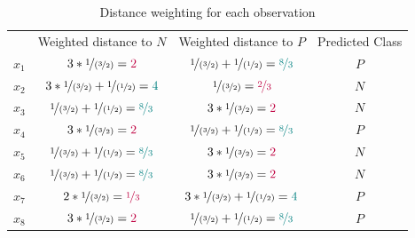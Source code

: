 \documentclass[12pt]{article}
\begin{document}
\begin{enumerate}[leftmargin=\labelsep]
\begin{table}[h]
  \centering
  \renewcommand{\arraystretch}{1.35} %
  \begin{tabular}{c|c|c|c}
        & Weighted distance to $N$                                & Weighted distance to $P$                                & Predicted Class \\
  $x_1$ & $3 * \nicefrac{1}{(\nicefrac{3}{2})} = \textcolor{purple}{2}$                           & $ \nicefrac{1}{(\nicefrac{3}{2})} + \nicefrac{1}{(\nicefrac{1}{2})} = \textcolor{teal}{\nicefrac{8}{3}}$    &  $P$               \\
  $x_2$ & $3 * \nicefrac{1}{(\nicefrac{3}{2})} + \nicefrac{1}{(\nicefrac{1}{2})} = \textcolor{teal}{4}$ & $ \nicefrac{1}{(\nicefrac{3}{2})} = \textcolor{purple}{\nicefrac{2}{3}}$                              &  $N$               \\
  $x_3$ & $ \nicefrac{1}{(\nicefrac{3}{2})} + \nicefrac{1}{(\nicefrac{1}{2})} = \textcolor{teal}{\nicefrac{8}{3}}$    & $3 * \nicefrac{1}{(\nicefrac{3}{2})} = \textcolor{purple}{2}$                           &  $N$               \\
  $x_4$ & $3 * \nicefrac{1}{(\nicefrac{3}{2})} = \textcolor{purple}{2}$                           & $ \nicefrac{1}{(\nicefrac{3}{2})} + \nicefrac{1}{(\nicefrac{1}{2})} = \textcolor{teal}{\nicefrac{8}{3}}$    &  $P$               \\
  $x_5$ & $ \nicefrac{1}{(\nicefrac{3}{2})} + \nicefrac{1}{(\nicefrac{1}{2})} = \textcolor{teal}{\nicefrac{8}{3}}$    & $3 * \nicefrac{1}{(\nicefrac{3}{2})} = \textcolor{purple}{2}$                           &  $N$               \\
  $x_6$ & $ \nicefrac{1}{(\nicefrac{3}{2})} + \nicefrac{1}{(\nicefrac{1}{2})} = \textcolor{teal}{\nicefrac{8}{3}}$    & $3 * \nicefrac{1}{(\nicefrac{3}{2})} = \textcolor{purple}{2}$                           &  $N$               \\
  $x_7$ & $2 * \nicefrac{1}{(\nicefrac{3}{2})} = \textcolor{purple}{\nicefrac{1}{3}}$                           & $3 * \nicefrac{1}{(\nicefrac{3}{2})} + \nicefrac{1}{(\nicefrac{1}{2})} = \textcolor{teal}{4}$ &  $P$               \\
  $x_8$ & $3 * \nicefrac{1}{(\nicefrac{3}{2})} = \textcolor{purple}{2}$                           & $ \nicefrac{1}{(\nicefrac{3}{2})} + \nicefrac{1}{(\nicefrac{1}{2})} = \textcolor{teal}{\nicefrac{8}{3}}$    &  $P$              
  \end{tabular}
  \caption{Distance weighting for each observation}
  \label{tab:my-table-1}
  \end{table}
  

\end{enumerate}
\end{document}
